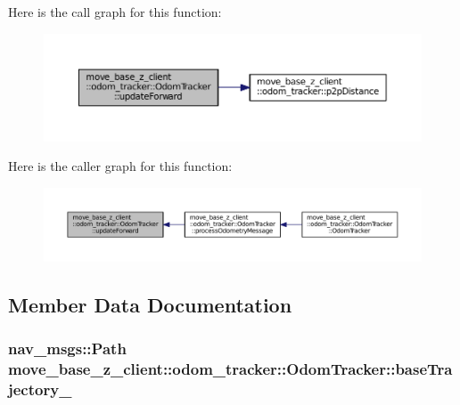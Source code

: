Here is the call graph for this function\+:
\nopagebreak
\begin{figure}[H]
\begin{center}
\leavevmode
\includegraphics[width=350pt]{classmove__base__z__client_1_1odom__tracker_1_1OdomTracker_a12cee73239bc7685c645f8f52859b61f_cgraph}
\end{center}
\end{figure}




Here is the caller graph for this function\+:
\nopagebreak
\begin{figure}[H]
\begin{center}
\leavevmode
\includegraphics[width=350pt]{classmove__base__z__client_1_1odom__tracker_1_1OdomTracker_a12cee73239bc7685c645f8f52859b61f_icgraph}
\end{center}
\end{figure}




\subsection{Member Data Documentation}
\subsubsection[{\texorpdfstring{base\+Trajectory\+\_\+}{baseTrajectory_}}]{\setlength{\rightskip}{0pt plus 5cm}nav\+\_\+msgs\+::\+Path move\+\_\+base\+\_\+z\+\_\+client\+::odom\+\_\+tracker\+::\+Odom\+Tracker\+::base\+Trajectory\+\_\+\hspace{0.3cm}{\ttfamily [protected]}}\hypertarget{classmove__base__z__client_1_1odom__tracker_1_1OdomTracker_a83fa5a9bfe0b2683eee33444d3f030ea}{}\label{classmove__base__z__client_1_1odom__tracker_1_1OdomTracker_a83fa5a9bfe0b2683eee33444d3f030ea}


